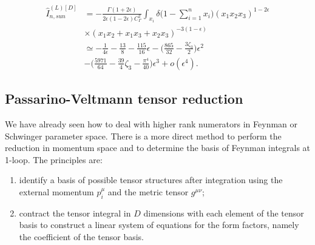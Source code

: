 \begin{ex}
\begin{equation}
\begin{split}
            \hat{I}_{n,sun}^{(L)[D]} &= -\frac{\Gamma(1 + 2\epsilon)}{2\epsilon(1-2\epsilon)C_\Gamma^2}\int_{x_i}\delta\bigg(1 - \sum_{i=1}^nx_i\bigg)(x_1x_2x_3)^{1-2\epsilon} \\
            &\times (x_1x_2 + x_1x_3 + x_2x_3)^{-3(1 - \epsilon)} \\
            &\simeq -\frac{1}{4\epsilon} - \frac{13}{8} - \frac{115}{16}\epsilon - \bigg(\frac{865}{32} - \frac{3\zeta_3}{2}\bigg)\epsilon^2 \\
            &-\bigg(\frac{5971}{64} - \frac{39}{4}\zeta_3 - \frac{\pi^4}{40}\bigg)\epsilon^3 + o(\epsilon^4).
        \end{split}
    \end{equation}
\end{ex}

\subsection{Passarino-Veltmann tensor reduction}
We have already seen how to deal with higher rank numerators in Feynman or Schwinger parameter space. There is a more direct method to perform the reduction in momentum space and to determine the basis of Feynman integrals at 1-loop. The principles are:
\begin{enumerate}
    \item identify a basis of possible tensor structures after integration using the external momentum $p_i^\mu$ and the metric tensor $g^{\mu\nu}$;
    \item contract the tensor integral in $D$ dimensions with each element of the tensor basis to construct a linear system of equations for the form factors, namely the coefficient of the tensor basis.
\end{enumerate}
